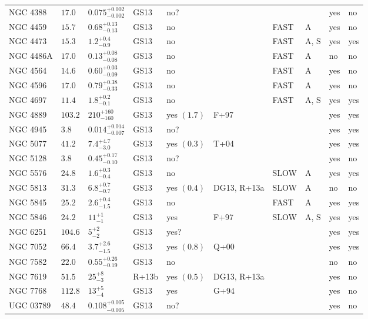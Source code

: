 \begin{table*}
\begin{center}
\begin{tabular}{llllllllll}
NGC 4388  &  $17.0$  &  $0.075_{-0.002}^{+0.002}$   &  GS13  &  no?  &     &      &     &  yes  &  no  \\ 
NGC 4459  &  $15.7$  &  $0.68_{-0.13}^{+0.13}$   &  GS13  &  no   &     &  FAST   &  A  &  yes  &  no  \\ 
NGC 4473  &  $15.3$  &  $1.2_{-0.9}^{+0.4}$   &  GS13  &  no   &     &  FAST   &  A, S  &  yes  &  yes  \\ 
NGC 4486A  &  $17.0$  &  $0.13_{-0.08}^{+0.08}$   &  GS13  &  no   &     &  FAST   &  A  &  no  &  no  \\ 
NGC 4564  &  $14.6$  &  $0.60_{-0.09}^{+0.03}$   &  GS13  &  no   &     &  FAST   &  A  &  yes  &  no  \\ 
NGC 4596  &  $17.0$  &  $0.79_{-0.33}^{+0.38}$   &  GS13  &  no   &     &  FAST   &  A  &  yes  &  no  \\ 
NGC 4697  &  $11.4$  &  $1.8_{-0.1}^{+0.2}$   &  GS13  &  no   &     &  FAST   &  A, S  &  yes  &  yes  \\ 
NGC 4889  &  $103.2$  &  $210_{-160}^{+160}$   &  GS13  &  yes  $(1.7)$  &  F+97  &      &     &  yes  &  yes  \\ 
NGC 4945  &  $3.8$  &  $0.014_{-0.007}^{+0.014}$   &  GS13  &  no?  &     &      &     &  yes  &  yes  \\ 
NGC 5077  &  $41.2$  &  $7.4_{-3.0}^{+4.7}$   &  GS13  &  yes  $(0.3)$  &  T+04  &      &     &  yes  &  yes  \\ 
NGC 5128  &  $3.8$  &  $0.45_{-0.10}^{+0.17}$   &  GS13  &  no?  &     &      &     &  yes  &  no  \\ 
NGC 5576  &  $24.8$  &  $1.6_{-0.4}^{+0.3}$   &  GS13  &  no   &     &   SLOW  &  A  &  yes  &  yes  \\ 
NGC 5813  &  $31.3$  &  $6.8_{-0.7}^{+0.7}$   &  GS13  &  yes  $(0.4)$  &  DG13, R+13a  &   SLOW  &  A  &  no  &  no  \\ 
NGC 5845  &  $25.2$  &  $2.6_{-1.5}^{+0.4}$   &  GS13  &  no   &     &  FAST   &  A  &  yes  &  yes  \\ 
NGC 5846  &  $24.2$  &  $11_{-1}^{+1}$   &  GS13  &  yes   &  F+97  &   SLOW  &  A, S  &  yes  &  yes  \\ 
NGC 6251  &  $104.6$  &  $5_{-2}^{+2}$   &  GS13  &  yes?  &     &      &     &  yes  &  yes  \\ 
NGC 7052  &  $66.4$  &  $3.7_{-1.5}^{+2.6}$   &  GS13  &  yes  $(0.8)$  &  Q+00  &      &     &  yes  &  yes  \\ 
NGC 7582  &  $22.0$  &  $0.55_{-0.19}^{+0.26}$   &  GS13  &  no   &     &      &     &  no  &  no  \\ 
NGC 7619  &  $51.5$  &  $25_{-3}^{+8}$   &  R+13b  &  yes  $(0.5)$  &  DG13, R+13a  &      &     &  yes  &  no  \\ 
NGC 7768  &  $112.8$  &  $13_{-4}^{+5}$   &  GS13  &  yes   &  G+94  &      &     &  yes  &  no  \\ 
UGC 03789  &  $48.4$  &  $0.108_{-0.005}^{+0.005}$   &  GS13  &  no?  &     &      &     &  yes  &  no  \\ 
\hline         
\end{tabular}   
\end{center}    
\end{table*}    
